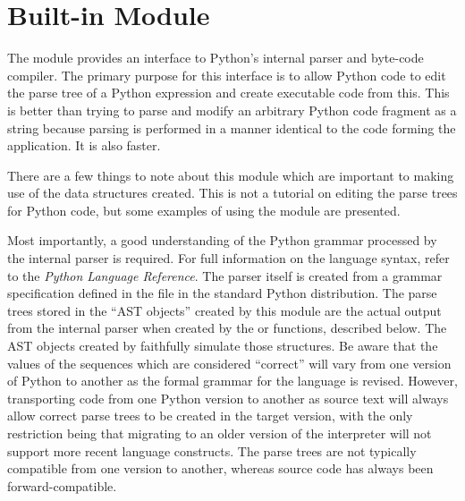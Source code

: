 %
%

\section{Built-in Module }
\label{module-parser}

The  module provides an interface to Python's internal
parser and byte-code compiler.  The primary purpose for this interface
is to allow Python code to edit the parse tree of a Python expression
and create executable code from this.  This is better than trying
to parse and modify an arbitrary Python code fragment as a string
because parsing is performed in a manner identical to the code
forming the application.  It is also faster.

There are a few things to note about this module which are important
to making use of the data structures created.  This is not a tutorial
on editing the parse trees for Python code, but some examples of using
the  module are presented.

Most importantly, a good understanding of the Python grammar processed
by the internal parser is required.  For full information on the
language syntax, refer to the \emph{Python Language Reference}.  The
parser itself is created from a grammar specification defined in the file
 in the standard Python distribution.  The parse
trees stored in the ``AST objects'' created by this module are the
actual output from the internal parser when created by the
 or  functions, described below.  The AST
objects created by  faithfully simulate those
structures.  Be aware that the values of the sequences which are
considered ``correct'' will vary from one version of Python to another
as the formal grammar for the language is revised.  However,
transporting code from one Python version to another as source text
will always allow correct parse trees to be created in the target
version, with the only restriction being that migrating to an older
version of the interpreter will not support more recent language
constructs.  The parse trees are not typically compatible from one
version to another, whereas source code has always been
forward-compatible.

